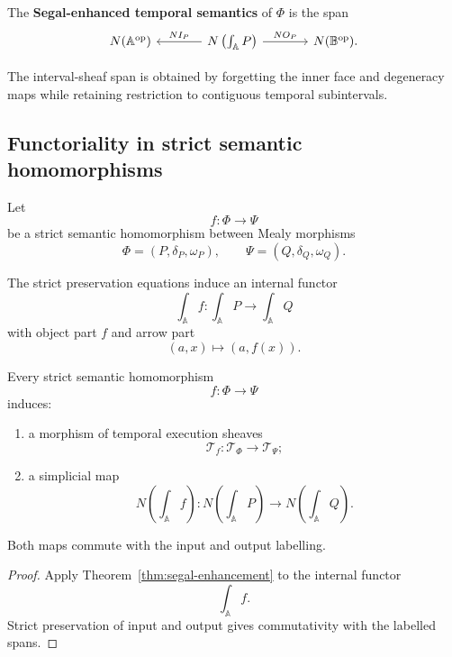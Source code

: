 \begin{definition}
\label{def:segal-enhanced-execution-semantics}
The \textbf{Segal-enhanced temporal semantics} of \(\Phi\) is the span
\[
\begin{tikzcd}[column sep=large]
    N(\mathbb A^{\mathrm{op}})
    &
    N\left(\int_{\mathbb A}P\right)
        \arrow[l, "NI_P"']
        \arrow[r, "NO_P"]
    &
    N(\mathbb B^{\mathrm{op}}).
\end{tikzcd}
\]
\end{definition}

The interval-sheaf span is obtained by forgetting the inner face and
degeneracy maps while retaining restriction to contiguous temporal
subintervals.

\subsection{Functoriality in strict semantic homomorphisms}
\label{subsec:temporal-functoriality-strict}

Let
\[
    f:\Phi\to\Psi
\]
be a strict semantic homomorphism between Mealy morphisms
\[
    \Phi=(P,\delta_P,\omega_P),
    \qquad
    \Psi=(Q,\delta_Q,\omega_Q).
\]

The strict preservation equations induce an internal functor
\[
    \int_{\mathbb A}f:
    \int_{\mathbb A}P
    \to
    \int_{\mathbb A}Q
\]
with object part \(f\) and arrow part
\[
    (a,x)\longmapsto(a,f(x)).
\]

\begin{proposition}
\label{prop:functoriality-temporal-execution}
Every strict semantic homomorphism
\[
    f:\Phi\to\Psi
\]
induces:
\begin{enumerate}
    \item a morphism of temporal execution sheaves
    \[
        \mathscr T_f:
        \mathscr T_\Phi\to\mathscr T_\Psi;
    \]
    \item a simplicial map
    \[
        N\left(\int_{\mathbb A}f\right):
        N\left(\int_{\mathbb A}P\right)
        \to
        N\left(\int_{\mathbb A}Q\right).
    \]
\end{enumerate}
Both maps commute with the input and output labelling.
\end{proposition}

\begin{proof}
Apply Theorem~\ref{thm:segal-enhancement} to the internal functor
\[
    \int_{\mathbb A}f.
\]
Strict preservation of input and output gives commutativity with the labelled
spans.
\end{proof}

